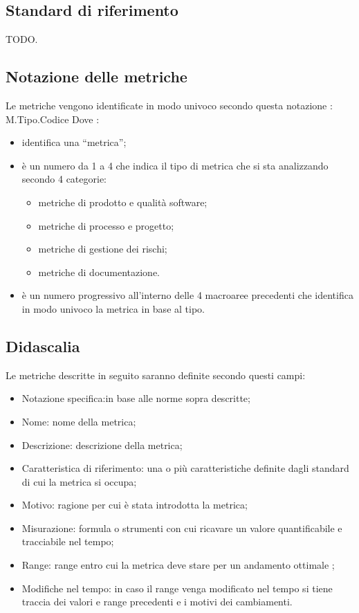 \subsection{Standard di riferimento}

TODO.

\subsection{Notazione delle metriche}
Le metriche vengono identificate in modo univoco secondo questa notazione : M.Tipo.Codice
Dove : 
\begin{itemize}
    \item \left[ M \right] identifica una “metrica”;
    \item {} è un numero da 1 a 4 che indica il tipo di metrica che si sta analizzando secondo 4 categorie: 
        \begin{itemize}
            \item metriche di prodotto e qualità software; 
            \item metriche di processo e progetto;
            \item metriche di gestione dei rischi;
            \item metriche di documentazione.
        \end{itemize}
    \item {} è un numero progressivo all’interno delle 4 macroaree precedenti che identifica in modo univoco la metrica in base al tipo.
\end{itemize}



\subsection{Didascalia}
Le metriche descritte in seguito saranno definite secondo questi campi: 
\begin{itemize}
    \item Notazione specifica:in base alle norme sopra descritte;
    \item Nome: nome della metrica;
    \item Descrizione: descrizione della metrica;
    \item Caratteristica di riferimento: una o più caratteristiche definite dagli standard di cui la metrica si occupa;
    \item Motivo: ragione per cui è stata introdotta la metrica;
    \item Misurazione: formula o strumenti con cui ricavare un valore quantificabile e tracciabile nel tempo;
    \item Range: range entro cui la metrica deve stare per un andamento ottimale    ;
    \item Modifiche nel tempo: in caso il range venga modificato nel tempo si tiene traccia dei valori e range precedenti e i motivi dei cambiamenti.
\end{itemize}


